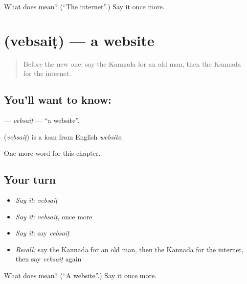 \begin{tcolorbox}[breakable,colback=teal!4,colframe=teal!35!black,title={Before you move on}]
What does  mean? (\textquotedblleft{}The internet\textquotedblright{}.) Say it once more.
\end{tcolorbox}
\section[\texorpdfstring{\kn{ವೆಬ್ಸೈಟ್} (vebsaiṭ)}{ವೆಬ್ಸೈಟ್ (vebsaiṭ)}]{ (vebsaiṭ) — a website}

\label{lesson:KA-C264-vebsait}



\begin{quote}
Before the new one: say the Kannada for an old man, then the Kannada for the internet.
\end{quote}

\subsection*{You'll want to know: }
\textbf{} — \emph{vebsaiṭ} — \textquotedblleft{}a website\textquotedblright{}.

\begin{cousinweb}
\textbf{} (\emph{vebsaiṭ}) is a loan from English \emph{website}.
\end{cousinweb}

\begin{grammarlens}[title={What you've built}]
One more word for this chapter.
\end{grammarlens}

\subsection*{Your turn}
\begin{itemize}
\raggedright
  \item \emph{Say it:} \emph{vebsaiṭ}
  \item \emph{Say it:} \emph{vebsaiṭ}, once more
  \item \emph{Say it:} say \emph{vebsaiṭ}
  \item \emph{Recall:} say the Kannada for an old man, then the Kannada for the internet, then say \emph{vebsaiṭ} again
\end{itemize}

\begin{tcolorbox}[breakable,colback=teal!4,colframe=teal!35!black,title={Before you move on}]
What does  mean? (\textquotedblleft{}A website\textquotedblright{}.) Say it once more.
\end{tcolorbox}
